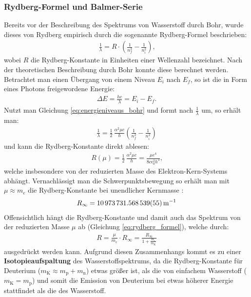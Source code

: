 \documentclass[11pt, a4paper]{article}
\numberwithin{equation}{section}
\begin{document}
\subsubsection{Rydberg-Formel und Balmer-Serie}
Bereits vor der Beschreibung des Spektrums von Wasserstoff durch Bohr, wurde dieses von Rydberg empirisch durch die sogenannte Rydberg-Formel beschrieben:
\begin{align}
	\label{eq:rydberg_formel}
	\frac{1}{\lambda} = R \cdot \left( \frac{1}{n_f^2} - \frac{1}{n_i^2} \right) \text{,}
\end{align}
wobei $R$ die Rydberg-Konstante in Einheiten einer Wellenzahl bezeichnet.
Nach der theoretischen Beschreibung durch Bohr konnte diese berechnet werden.
Betrachtet man einen Übergang von einem Niveau $E_i$ nach $E_f$, so ist die in Form eines Photons freigewordene Energie:
\begin{align}
	\Delta E = \frac{h c}{\lambda} = E_i - E_f \text{.}
\end{align}
Nutzt man Gleichung \ref{eq:energieniveaus_bohr} und formt nach $\frac{1}{\lambda}$ um, so erhält man:
\begin{align}
	\frac{1}{\lambda} = \frac{1}{2} \, \frac{\alpha^2 \mu c}{h} \left( \frac{1}{n_f^2} - \frac{1}{n_i^2}\right)
\end{align}
und kann die Rydberg-Konstante direkt ablesen:
\begin{align}
\label{eq:rydberg_konstante}
R(\mu) = \frac{1}{2} \, \frac{\alpha^2 \mu c}{h} = \frac{\mu e^4}{8 c \epsilon_0^2 h^3} \text{,}
\end{align}
welche insbesondere von der reduzierten Masse des Elektron-Kern-Systems abhängt.
Vernachlässigt man die Schwerpunktsbewegung so erhält man mit $\mu \approx m_e$ die Rydberg-Konstante bei unendlicher Kernmasse \cite{CODATA}:
\begin{align}
	R_\infty = \SI{10973731.568539 +- 0.000055}{\per\metre}
\end{align}
Offensichtlich hängt die Rydberg-Konstante und damit auch das Spektrum von der reduzierten Masse $\mu$ ab (Gleichung \ref{eq:rydberg_formel}), welche durch:
\begin{align}
	R = \frac{\mu}{m_e} \cdot R_\infty = \frac{R_\infty}{1 + \frac{m_e}{m_\mathrm{K}}}
\end{align}
ausgedrückt werden kann.
Aufgrund diesen Zusammenhangs kommt es zu einer \textbf{Isotopieaufspaltung} des Wasserstoffspektrums, da die Rydberg-Konstante für Deuterium ($m_\mathrm{K} \approx m_\mathrm{p} + m_\mathrm{n}$) etwas größer ist, als die von einfachem Wasserstoff ($m_\mathrm{K} = m_\mathrm{p}$) und somit die Emission von Deuterium bei etwas höherer Energie stattfindet als die des Wasserstoff.
\end{document}
